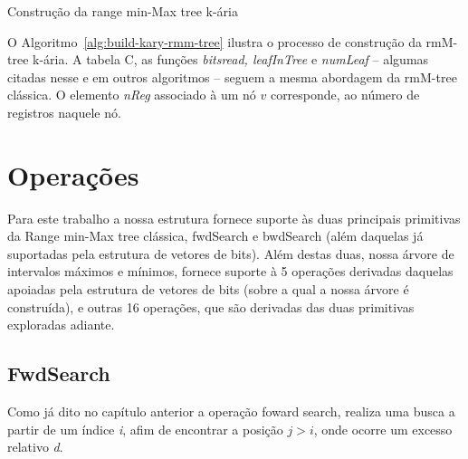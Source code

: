 \begin{algorithm}[h!]
{{{    
                }
    
            }
        } 
        \caption{Construção da range min-Max tree k-ária}
        \label{alg:build-kary-rmm-tree}
    \end{algorithm} 

O Algoritmo~\ref{alg:build-kary-rmm-tree} ilustra o processo de construção da rmM-tree k-ária. A tabela C, as funções \textit{bitsread, leafInTree} e \textit{numLeaf} -- algumas citadas nesse e em outros algoritmos -- seguem a mesma abordagem da rmM-tree clássica. O elemento \textit{nReg} associado à um nó $v$ corresponde, ao número de registros naquele nó.



\section{Operações}\label{sec:optimized-operation}
Para este trabalho a nossa estrutura fornece suporte às duas principais primitivas da Range min-Max tree clássica, fwdSearch e bwdSearch (além daquelas já suportadas pela estrutura de vetores de bits). Além destas duas, nossa árvore de intervalos máximos e mínimos, fornece suporte à 5 operações derivadas daquelas apoiadas pela estrutura de vetores de bits (sobre a qual a nossa árvore é construída), e outras 16 operações, que são derivadas das duas primitivas exploradas adiante.


\subsection{FwdSearch}\label{sec:fwdSearch}
Como já dito no capítulo anterior a operação foward search, realiza uma busca a partir de um índice \textit{i}, afim de encontrar a posição $j>i$, onde ocorre um excesso relativo \textit{d}.

